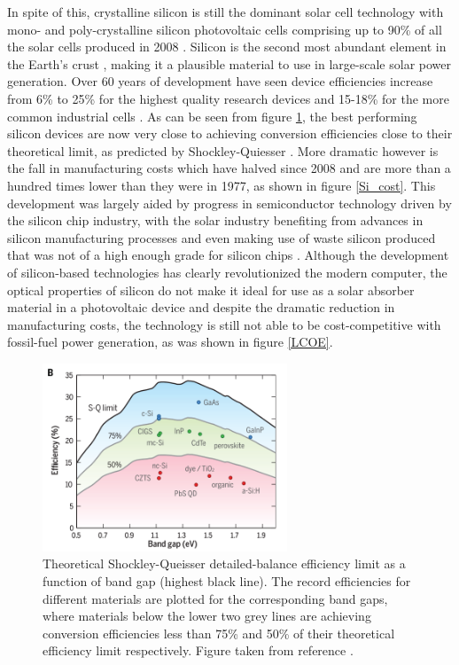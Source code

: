 In spite of this, crystalline silicon is still the dominant solar cell technology with mono- and poly-crystalline silicon photovoltaic cells comprising up to 90\% of all the solar cells produced in 2008  \cite{Si_rev}. Silicon is the second most abundant element in the Earth's crust \cite{Si_abundance}, making it a plausible material to use in large-scale solar power generation. Over 60 years of development have seen device efficiencies increase from 6\% to 25\% for the highest quality research devices and 15-18\% for the more common industrial cells \cite{Si_rev}. As can be seen from figure \ref{SQ}, the best performing silicon devices are now very close to achieving conversion efficiencies close to their theoretical limit, as predicted by Shockley-Quiesser \cite{SQ_1961}. More dramatic however is the fall in manufacturing costs which have halved since 2008 and are more than a hundred times lower than they were in 1977, as shown in figure \ref{Si_cost}. This development was largely aided by progress in semiconductor technology driven by the silicon chip industry, with the solar industry benefiting from advances in silicon manufacturing processes and even making use of waste silicon produced that was not of a high enough grade for silicon chips \cite{PV_history1}. Although the development of silicon-based technologies has clearly revolutionized the modern computer, the optical properties of silicon do not make it ideal for use as a solar absorber material in a photovoltaic device and despite the dramatic reduction in manufacturing costs, the technology is still not able to be cost-competitive with fossil-fuel power generation, as was shown in figure \ref{LCOE}.\\

\begin{figure}[h!]
  \centering
    \includegraphics[width=0.65\textwidth]{figures/SQ_new.png}
    \caption{Theoretical Shockley-Queisser detailed-balance efficiency limit as a function of band gap\cite{SQ_1961} (highest black line). The record efficiencies for different materials are plotted for the corresponding band gaps, where materials below the lower two grey lines are achieving conversion efficiencies less than 75\% and 50\% of their theoretical efficiency limit respectively. Figure taken from reference .}
  \label{SQ}
\end{figure}


